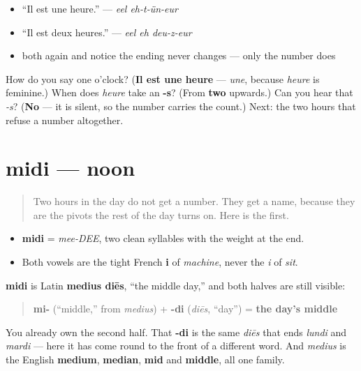 \begin{itemize}
\raggedright
  \item \textquotedblleft{}Il est une heure.\textquotedblright{} — \emph{eel eh-t-ün-eur}
  \item \textquotedblleft{}Il est deux heures.\textquotedblright{} — \emph{eel eh deu-z-eur}
  \item both again and notice the ending never changes — only the number does
\end{itemize}

\begin{tcolorbox}[breakable,colback=teal!4,colframe=teal!35!black,title={Before you move on}]
How do you say one o'clock? (\textbf{Il est une heure} — \emph{une}, because \emph{heure} is feminine.) When does \emph{heure} take an \textbf{-s}? (From \textbf{two} upwards.) Can you hear that \emph{-s}? (\textbf{No} — it is silent, so the number carries the count.) Next: the two hours that refuse a number altogether.
\end{tcolorbox}
\section[midi]{midi — noon}

\label{lesson:FR-C08-midi}



\begin{quote}
Two hours in the day do not get a number. They get a name, because they are the pivots the rest of the day turns on. Here is the first.
\end{quote}

\begin{sounds}
\begin{itemize}
\raggedright
  \item \textbf{midi} = \emph{mee-DEE}, two clean syllables with the weight at the end.
  \item Both vowels are the tight French \textbf{i} of \emph{machine}, never the \emph{i} of \emph{sit}.
\end{itemize}
\end{sounds}

\begin{cousinweb}
\textbf{midi} is Latin \textbf{medius diēs}, \textquotedblleft{}the middle day,\textquotedblright{} and both halves are still visible:

\begin{quote}
\textbf{mi-} (\textquotedblleft{}middle,\textquotedblright{} from \emph{medius}) + \textbf{-di} (\emph{diēs}, \textquotedblleft{}day\textquotedblright{}) = \textbf{the day's middle}
\end{quote}

You already own the second half. That \textbf{-di} is the same \emph{diēs} that ends \emph{lundi} and \emph{mardi} — here it has come round to the front of a different word. And \emph{medius} is the English \textbf{medium}, \textbf{median}, \textbf{mid} and \textbf{middle}, all one family.
\end{cousinweb}

